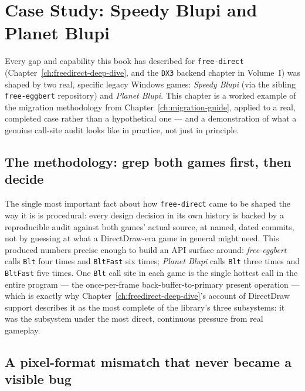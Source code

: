 \chapter{Case Study: Speedy Blupi and Planet Blupi}
\label{ch:blupi-case-study}

Every gap and capability this book has described for \texttt{free-direct}
(Chapter~\ref{ch:freedirect-deep-dive}, and the \texttt{DX3} backend chapter in Volume~I) was
shaped by two real, specific legacy Windows games: \emph{Speedy Blupi} (via the sibling
\texttt{free-eggbert} repository) and \emph{Planet Blupi}. This chapter is a worked example of
the migration methodology from Chapter~\ref{ch:migration-guide}, applied to a real, completed
case rather than a hypothetical one --- and a demonstration of what a genuine call-site audit
looks like in practice, not just in principle.

\section{The methodology: grep both games first, then decide}

The single most important fact about how \texttt{free-direct} came to be shaped the way it is
is procedural: every design decision in its own history is backed by a reproducible audit
against both games' actual source, at named, dated commits, not by guessing at what a
DirectDraw-era game in general might need. This produced numbers precise enough to build an
API surface around: \emph{free-eggbert} calls \texttt{Blt} four times and \texttt{BltFast} six
times; \emph{Planet Blupi} calls \texttt{Blt} three times and \texttt{BltFast} five times. One
\texttt{Blt} call site in each game is the single hottest call in the entire program --- the
once-per-frame back-buffer-to-primary present operation --- which is exactly why
Chapter~\ref{ch:freedirect-deep-dive}'s account of DirectDraw support describes it as the most
complete of the library's three subsystems: it was the subsystem under the most direct,
continuous pressure from real gameplay.

\section{A pixel-format mismatch that never became a visible bug}

